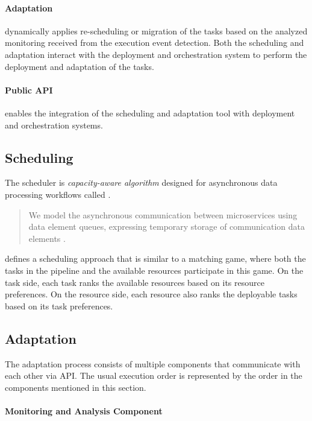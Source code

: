   \paragraph{Adaptation } dynamically applies re-scheduling or migration of the tasks based on the analyzed monitoring received from the execution event detection. Both the scheduling and adaptation interact with the deployment and orchestration system to perform the deployment and adaptation of the tasks.

  \paragraph{Public API } enables the integration of the \SAA{} scheduling and adaptation tool with deployment and orchestration systems. \cite{kimovskiBigDataPipeline2022}


  \subsection{Scheduling}
  \label{sec:scheduling-saa-background}

    The scheduler is \emph{capacity-aware algorithm} designed for asynchronous data processing workflows called \CMATCH.

    \begin{quote}
        We model the asynchronous communication between microservices using data element queues, expressing temporary storage of communication data elements \cite{mehranMatchingbasedSchedulingAsynchronous2022}.
    \end{quote} 
    \CMATCH defines a scheduling approach that is similar to a matching game, where both the tasks in the pipeline and the available resources participate in this game.
    On the task side, each task ranks the available resources based on its resource preferences.
    On the resource side, each resource also ranks the deployable tasks based on its task preferences.

  \subsection{Adaptation}
  \label{sec:adaptation-saa-background}

      The adaptation process consists of multiple components that communicate with each other via API.
      The usual execution order is represented by the order in the components mentioned in this section.
      

      \paragraph{Monitoring and Analysis Component }
      \label{par:monitoring-component-saa-background}
      
